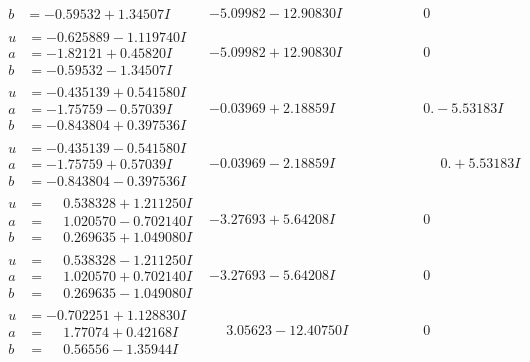 \documentclass[1p]{elsarticle_modified}
\theoremstyle{definition}
\begin{document}
$$\begin{array}{c|c|c}
\begin{aligned}
b &= -0.59532 + 1.34507 I\end{aligned}
 & -5.09982 - 12.90830 I & \phantom{-0.000000 } 0 \\ \hline\begin{aligned}
u &= -0.625889 - 1.119740 I \\
a &= -1.82121 + 0.45820 I \\
b &= -0.59532 - 1.34507 I\end{aligned}
 & -5.09982 + 12.90830 I & \phantom{-0.000000 } 0 \\ \hline\begin{aligned}
u &= -0.435139 + 0.541580 I \\
a &= -1.75759 - 0.57039 I \\
b &= -0.843804 + 0.397536 I\end{aligned}
 & -0.03969 + 2.18859 I & \phantom{-0.000000 } 0. - 5.53183 I \\ \hline\begin{aligned}
u &= -0.435139 - 0.541580 I \\
a &= -1.75759 + 0.57039 I \\
b &= -0.843804 - 0.397536 I\end{aligned}
 & -0.03969 - 2.18859 I & \phantom{-0.000000 -}0. + 5.53183 I \\ \hline\begin{aligned}
u &= \phantom{-}0.538328 + 1.211250 I \\
a &= \phantom{-}1.020570 - 0.702140 I \\
b &= \phantom{-}0.269635 + 1.049080 I\end{aligned}
 & -3.27693 + 5.64208 I & \phantom{-0.000000 } 0 \\ \hline\begin{aligned}
u &= \phantom{-}0.538328 - 1.211250 I \\
a &= \phantom{-}1.020570 + 0.702140 I \\
b &= \phantom{-}0.269635 - 1.049080 I\end{aligned}
 & -3.27693 - 5.64208 I & \phantom{-0.000000 } 0 \\ \hline\begin{aligned}
u &= -0.702251 + 1.128830 I \\
a &= \phantom{-}1.77074 + 0.42168 I \\
b &= \phantom{-}0.56556 - 1.35944 I\end{aligned}
 & \phantom{-}3.05623 - 12.40750 I & \phantom{-0.000000 } 0 \\ \hline\begin{aligned}

\end{aligned}
\end{array}$$
\end{document}
